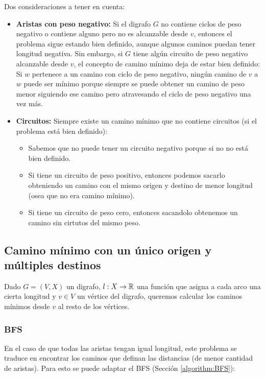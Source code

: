 Dos consideraciones a tener en cuenta:
\begin{itemize}
  \item \textbf{Aristas con peso negativo:} Si el digrafo \(G\) no contiene ciclos de peso negativo o contiene alguno pero no es alcanzable desde \(v\), entonces el problema sigue estando bien definido, aunque algunos caminos puedan tener longitud negativa. Sin embargo, si \(G\) tiene algún circuito de peso negativo alcanzable desde \(v\), el concepto de camino mínimo deja de estar bien definido: Si \(w\) pertenece a un camino con ciclo de peso negativo, ningún camino de \(v\) a \(w\) puede ser mínimo porque siempre se puede obtener un camino de peso menor siguiendo ese camino pero atravesando el ciclo de peso negativo una vez más.
  \item \textbf{Circuitos:} Siempre existe un camino mínimo que no contiene circuitos (si el problema está bien definido):
        \begin{itemize}
          \item Sabemos que no puede tener un circuito negativo porque si no no está bien definido.
          \item Si tiene un circuito de peso positivo, entonces podemos sacarlo obteniendo un camino con el mismo origen y destino de menor longitud (osea que no era camino mínimo).
          \item Si tiene un circuito de peso cero, entonces sacandolo obtenemos un camino sin cirtutos del mismo peso.
        \end{itemize}
\end{itemize}

\subsection{Camino mínimo con un único origen y múltiples destinos}
Dado \(G = (V, X)\) un digrafo, \(l: X\to\mathbb{R}\) una función que asigna a cada arco una cierta longitud y \(v\in V\) un vértice del digrafo, queremos calcular los caminos mínimos desde \(v\) al resto de los vértices.

\subsubsection{BFS}
En el caso de que todas las aristas tengan igual longitud, este problema se traduce en encontrar los caminos que definan las distancias (de menor cantidad de aristas). Para esto se puede adaptar el BFS (Sección \ref{algorithm:BFS}):

